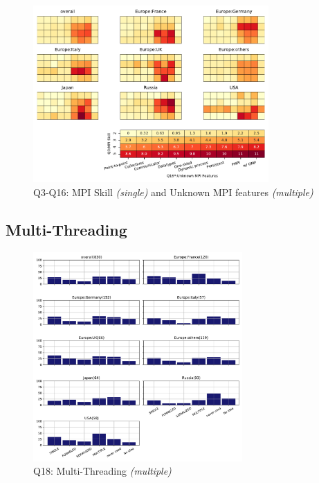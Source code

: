 \documentclass[conference,10pt,letterpaper]{IEEEtran}
\begin{document}
\begin{figure}[htb]
\begin{center}
\includegraphics[width=9cm]{Figs/Q3-Q16.pdf}
\caption{Q3-Q16: MPI Skill {\it(single)} and Unknown MPI features {\it(multiple)}}
\label{fig:using-mpi-aspects}
\end{center}
\end{figure}

\subsection{Multi-Threading}

\begin{figure}[htb]
\begin{center}
\includegraphics[width=8cm]{Figs/Q18.pdf}
\caption{Q18: Multi-Threading {\it(multiple)}}
\label{fig:multi-thread}
\end{center}
\end{figure}
\end{document}
